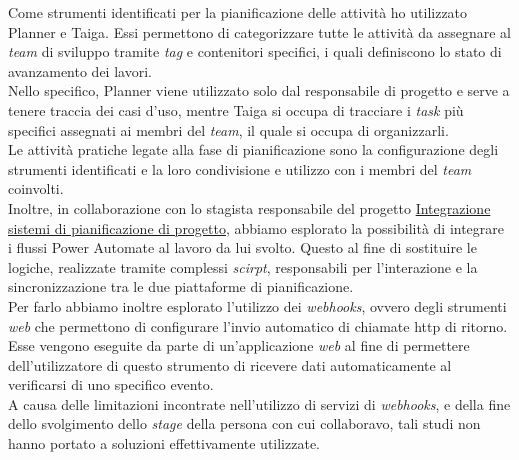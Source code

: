 Come strumenti identificati per la pianificazione delle attività ho utilizzato Planner e Taiga.
Essi permettono di categorizzare tutte le attività da assegnare al \emph{team} di sviluppo tramite \emph{tag} e contenitori specifici, i quali definiscono lo stato di avanzamento dei lavori.\\
Nello specifico, Planner viene utilizzato solo dal responsabile di progetto e serve a tenere traccia dei casi d'uso, mentre Taiga si occupa di tracciare i \emph{task} più specifici assegnati ai membri del \emph{team}, il quale si occupa di organizzarli.\\
    
Le attività pratiche legate alla fase di pianificazione sono la configurazione degli strumenti identificati e la loro condivisione e utilizzo con i membri del \emph{team} coinvolti.\\
Inoltre, in collaborazione con lo stagista responsabile del progetto \hyperref[stageGiacomo]{Integrazione sistemi di pianificazione di progetto}, abbiamo esplorato la possibilità di integrare i flussi Power Automate al lavoro da lui svolto.
Questo al fine di sostituire le logiche, realizzate tramite complessi \emph{scirpt}, responsabili per l'interazione e la sincronizzazione tra le due piattaforme di pianificazione.\\
Per farlo abbiamo inoltre esplorato l'utilizzo dei \emph{webhooks}, ovvero degli strumenti \emph{web} che permettono di configurare l'invio automatico di chiamate \gls{http} di ritorno.
Esse vengono eseguite da parte di un'applicazione \emph{web} al fine di permettere dell'utilizzatore di questo strumento di ricevere dati automaticamente al verificarsi di uno specifico evento.\\
A causa delle limitazioni incontrate nell'utilizzo di servizi di \emph{webhooks}, e della fine dello svolgimento dello \emph{stage} della persona con cui collaboravo, tali studi non hanno portato a soluzioni effettivamente utilizzate.


